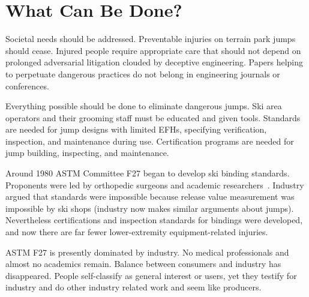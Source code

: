 \documentclass[smallextended]{svjour3}       %
\begin{document}
\section{What Can Be Done?}
\label{sec:action}
%
Societal needs should be addressed. Preventable injuries on terrain park jumps
should cease. Injured people require appropriate care that should not depend on
prolonged adversarial litigation clouded by deceptive engineering. Papers helping to
perpetuate dangerous practices do not belong in engineering journals or
conferences.

Everything possible should be done to eliminate dangerous jumps. Ski area
operators and their grooming staff must be educated and given tools. Standards
are needed for jump designs with limited EFHs, specifying verification,
inspection, and maintenance during use. Certification programs are needed for
jump building, inspecting, and maintenance.

Around 1980 ASTM Committee F27 began to develop ski binding standards. Proponents
were led by orthopedic surgeons and academic researchers~\cite{Bahniuk1996}.
Industry argued that standards were impossible because release value measurement 
was impossible by ski
shops (industry now makes similar arguments about jumps). Nevertheless
certifications and inspection standards for bindings were developed, and now
there are far fewer lower-extremity equipment-related injuries.

ASTM F27 is presently dominated by industry. No medical professionals and almost no
academics remain. Balance between consumers and industry has disappeared. People
self-classify as general interest or users, yet they testify for industry and
do other industry related work and seem like producers.

\end{document}
